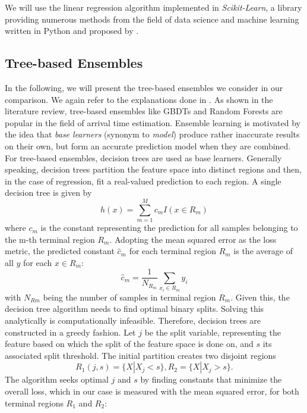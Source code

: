 We will use the linear regression algorithm implemented in \textit{Scikit-Learn}, a library providing numerous methods from the field of data science and machine learning written in Python and proposed by \cite{scikit-learn}.

\subsection{Tree-based Ensembles}

In the following, we will present the tree-based ensembles we consider in our comparison. We again refer to the explanations done in \cite{friedman2001elements}.
As shown in the literature review, tree-based ensembles like GBDTs and Random Forests are popular in the field of arrival time estimation. Ensemble learning is motivated by the idea that \textit{base learners} (synonym to \textit{model}) produce rather inaccurate results on their own, but form an accurate prediction model when they are combined. For tree-based ensembles, decision trees are used as base learners. 
Generally speaking, decision trees partition the feature space into distinct regions and then, in the case of regression, fit a real-valued prediction to each region. 
A single decision tree is given by
\begin{equation}
h(x) = \sum_{m=1}^{M} c_m I(x \in R_m)
\end{equation}
where $ c_m $ is the constant representing the prediction for all samples belonging to the m-th terminal region $ R_m $. Adopting the mean squared error as the loss metric, the predicted constant $ \hat{c}_m $ for each terminal region $ R_m $ is the average of all $ y $ for each $ x \in R_m $:
\begin{equation}
	\hat{c}_m =  \dfrac{1}{N_{R_m}}\sum_{x_i \in R_m}^{} y_i
\end{equation}
with $ N_{Rm} $ being the number of samples in terminal region $ R_m $. Given this, the decision tree algorithm needs to find optimal binary splits. Solving this analytically is computationally infeasible. Therefore, decision trees are constructed in a greedy fashion.
Let $ j $ be the split variable, representing the feature based on which the split of the feature space is done on, and $ s $ its associated split threshold.
The initial partition creates two disjoint regions
\begin{equation}
	R_1 (j,s) = \{X | X_j < s \}, R_{2} = \{X | X_j > s\}.
\end{equation}
The algorithm seeks optimal $ j $ and $ s $ by finding constants that minimize the overall loss, which in our case is measured with the mean squared error, for both terminal regions $ R_1 $ and $ R_2 $:

